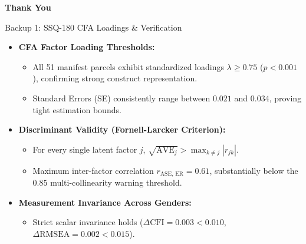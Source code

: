 \documentclass{beamer}
\begin{document}
\begin{frame}[c]
  \begin{center}
    {\Huge \textbf{\color{beamer@blendedblue} Thank You}}
  \end{center}
\end{frame}


\begin{frame}{Backup 1: SSQ-180 CFA Loadings \& Verification}
  \begin{itemize}\setlength{\itemsep}{6pt}\small
    \item \textbf{CFA Factor Loading Thresholds:}
    \begin{itemize}\setlength{\itemsep}{2pt}\footnotesize
      \item All 51 manifest parcels exhibit standardized loadings $\lambda \ge 0.75$ ($p < 0.001$), confirming strong construct representation.
      \item Standard Errors (SE) consistently range between $0.021$ and $0.034$, proving tight estimation bounds.
    \end{itemize}
    \item \textbf{Discriminant Validity (Fornell-Larcker Criterion):}
    \begin{itemize}\setlength{\itemsep}{2pt}\footnotesize
      \item For every single latent factor $j$, $\sqrt{\text{AVE}_j} > \max_{k \neq j}|r_{jk}|$.
      \item Maximum inter-factor correlation $r_{\text{ASE, ER}} = 0.61$, substantially below the $0.85$ multi-collinearity warning threshold.
    \end{itemize}
    \item \textbf{Measurement Invariance Across Genders:}
    \begin{itemize}\setlength{\itemsep}{2pt}\footnotesize
      \item Strict scalar invariance holds ($\Delta\text{CFI} = 0.003 < 0.010$, $\Delta\text{RMSEA} = 0.002 < 0.015$).
    \end{itemize}
  \end{itemize}
\end{frame}
\end{document}
